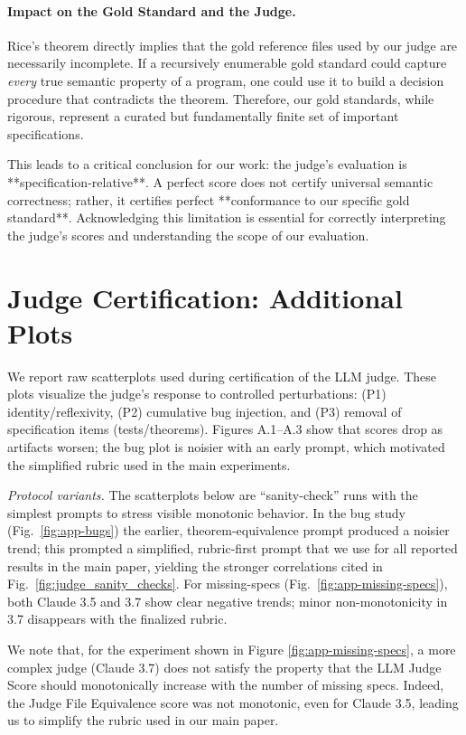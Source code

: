 \paragraph{Impact on the Gold Standard and the Judge.}
Rice's theorem directly implies that the gold reference files used by our judge are necessarily incomplete. If a recursively enumerable gold standard could capture \emph{every} true semantic property of a program, one could use it to build a decision procedure that contradicts the theorem. Therefore, our gold standards, while rigorous, represent a curated but fundamentally finite set of important specifications.

This leads to a critical conclusion for our work: the judge's evaluation is **specification-relative**. A perfect score does not certify universal semantic correctness; rather, it certifies perfect **conformance to our specific gold standard**. Acknowledging this limitation is essential for correctly interpreting the judge's scores and understanding the scope of our evaluation.


\section{Judge Certification: Additional Plots}\label{app:judge-cert}
We report raw scatterplots used during certification of the LLM judge. These plots visualize the judge’s response to controlled perturbations: (P1) identity/reflexivity, (P2) cumulative bug injection, and (P3) removal of specification items (tests/theorems). Figures A.1–A.3 show that scores drop as artifacts worsen; the bug plot is noisier with an early prompt, which motivated the simplified rubric used in the main experiments.

\textit{Protocol variants.} The scatterplots below are “sanity-check” runs with the simplest prompts to stress visible monotonic behavior. In the bug study (Fig.~\ref{fig:app-bugs}) the earlier, theorem-equivalence prompt produced a noisier trend; this prompted a simplified, rubric-first prompt that we use for all reported results in the main paper, yielding the stronger correlations cited in Fig.~\ref{fig:judge_sanity_checks}. For missing-specs (Fig.~\ref{fig:app-missing-specs}), both Claude 3.5 and 3.7 show clear negative trends; minor non-monotonicity in 3.7 disappears with the finalized rubric.

We note that, for the experiment shown in Figure \ref{fig:app-missing-specs}, a more complex judge (Claude 3.7) does not satisfy the property that the LLM Judge Score should monotonically increase with the number of missing specs. Indeed, the Judge File Equivalence score was not monotonic, even for Claude 3.5, leading us to simplify the rubric used in our main paper.

